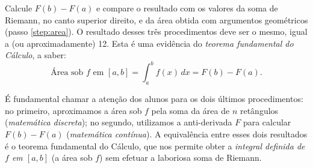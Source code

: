 \documentclass[a4paper,12pt]{scrartcl}
\begin{document}
\begin{compactenum}
      \item Calcule $F(b) - F(a)$ e compare o resultado com os valores da soma de Riemann, no canto superior direito, e da área obtida com argumentos geométricos (passo \ref{step:area}). O resultado desses três procedimentos deve ser o mesmo, igual a (ou aproximadamente) 12. Esta é uma evidência do \emph{teorema fundamental do Cálculo}, a saber:
      \begin{equation*}
       \text{Área sob $f$ em $[a,b]$} = \int_a^b f(x)\,dx = F(b) - F(a).
      \end{equation*}
      
      É fundamental chamar a atenção dos alunos para os dois últimos procedimentos: no primeiro, aproximamos a área sob $f$ pela soma da área de $n$ retângulos (\emph{matemática discreta}); no segundo, utilizamos a anti-derivada $F$ para calcular $F(b) - F(a)$ (\emph{matemática contínua}). A equivalência entre esses dois resultados é o teorema fundamental do Cálculo, que nos permite obter a \emph{integral definida de $f$ em $[a,b]$} (a área sob $f$) sem efetuar a laboriosa soma de Riemann.

    \end{compactenum}
\end{document}
